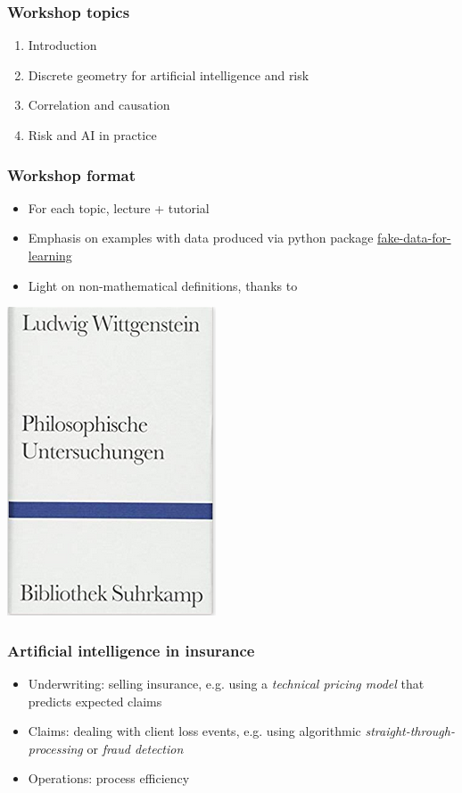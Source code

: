 \begin{frame}
\frametitle{Workshop topics}
\begin{enumerate}
\item Introduction
\item Discrete geometry for artificial intelligence and risk
\item Correlation and causation
\item Risk and AI in practice
\end{enumerate}
\end{frame}

\begin{frame}
\frametitle{Workshop format}

\begin{itemize}
\item For each topic, lecture + tutorial
\item Emphasis on examples with data produced via python package \href{https://munichpavel.github.io/fake-data-for-learning/}{fake-data-for-learning}
\item Light on non-mathematical definitions, thanks to
\end{itemize}
\centering
\includegraphics[width=0.3\textheight]{graphics/pi_wittgenstein}
\end{frame}

\begin{frame}
  \frametitle{Artificial intelligence in insurance}

  \begin{itemize}
    \item Underwriting: selling insurance, e.g. using a \emph{technical pricing model} that predicts expected claims
    \item Claims: dealing with client loss events, e.g. using algorithmic \emph{straight-through-processing} or \emph{fraud detection}
    \item Operations: process efficiency
  \end{itemize}
\end{frame}

